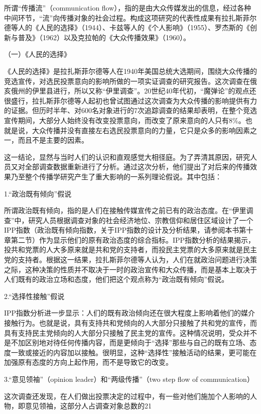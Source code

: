 \documentclass[UTF8,12pt]{ctexart}
\numberwithin{equation}{section} %
\numberwithin{figure}{section}
\numberwithin{table}{section}
\begin{document}
	所谓“传播流”（communication flow），指的是由大众传媒发出的信息，经过各种中间环节，“流”向传播对象的社会过程。构成这项研究的代表性成果有拉扎斯菲尔德等人的《人民的选择》（1944）、卡兹等人的《个人影响》（1955）、罗杰斯的《创新与普及》（1962）以及克拉帕的《大众传播效果》（1960）。
	
	（一）《人民的选择》
	
	《人民的选择》是拉扎斯菲尔德等人在1940年美国总统大选期间，围绕大众传播的竞选宣传，对选民投票意向的影响所做的一项实证调查的研究报告。这次调查在俄亥俄州的伊里县进行，所以又称“伊里调查”。20世纪40年代初，“魔弹论”的观点还很盛行，拉扎斯菲尔德等人起初也曾试图通过这次调查为大众传播的影响提供有力的证据。但历时半年、对600名对象进行的7次追踪调查的结果却表明，在整个竞选宣传期间，大部分人始终没有改变投票意向，而改变了原来意向的人只有8\%。也就是说，大众传播并没有直接左右选民投票意向的力量，它只是众多的影响因素之一，而且不是主要的因素。
	
	这一结论，显然与当时人们的认识和直观感觉大相径庭。为了弄清其原因，研究人员又对全部调查数据重新进行了分析。通过这次分析，他们提出了对后来的传播效果乃至整个传播学研究产生了重大影响的一系列理论假说。其中包括：
	
	1.“政治既有倾向”假说
	
	所谓政治既有倾向，指的是人们在接触传媒宣传之前已有的政治态度。在“伊里调查”中，研究人员根据调查对象的社会经济地位、宗教信仰和居住区域设计了一个IPP指数（政治既有倾向指数，关于IPP指数的设计及分析结果，请参阅本书第十章第二节）作为显示他们的原有政治态度的综合指标。IPP指数分析的结果揭示，投共和党票的人大多原来就是共和党的支持者，而投民主党票的大多原来就是民主党的支持者。根据这一结果，拉扎斯菲尔德等人认为，人们在就政治问题进行决策之际，这种决策的性质并不取决于一时的政治宣传和大众传播，而是基本上取决于人们既有的政治立场和态度，他们把这个观点称为“政治既有倾向”假说。
	
	2.“选择性接触”假说
	
	IPP指数分析进一步显示：人们的既有政治倾向还在很大程度上影响着他们的媒介接触行为。也就是说，具有支持共和党倾向的人大部分只接触了共和党的宣传，而具有支持民主党倾向的人大部分只接触了民主党的宣传。这种情况说明，受众并不是不加区别地对待任何传播内容，而是更倾向于“选择”那些与自己的既有立场、态度一致或接近的内容加以接触。很明显，这种“选择性”接触活动的结果，更可能在加强原有态度的方向上起作用，而不是导致它的改变。
	
	3.“意见领袖”（opinion leader）和“两级传播”（two step flow of communication）
	
	这次调查还发现，在人们做出投票决定的过程中，有一些对他们施加个人影响的人物，即意见领袖，这部分人占调查对象总数的21%
	
\end{document}
